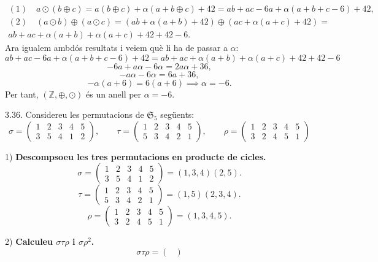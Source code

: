 \documentclass[11pt]{article}
\begin{document}
\begin{legal}
\begin{legal}
		\[
		\begin{array}{lcl}
			(1)\quad a\odot(b\oplus c)=a(b\oplus c)+\alpha(a+b\oplus c)+42=ab+ac-6a+\alpha(a+b+c-6)+42,\\
			(2)\quad (a\odot b)\oplus(a\odot c)=(ab+\alpha(a+b)+42)\oplus(ac+\alpha(a+c)+42)=\\
			ab+ac+\alpha(a+b)+\alpha(a+c)+42+42-6.
		\end{array}
		\]
		Ara igualem ambdós resultats i veiem què li ha de passar a $\alpha$:
		$$
		ab+ac-6a+\alpha(a+b+c-6)+42=ab+ac+\alpha(a+b)+\alpha(a+c)+42+42-6
		$$
		$$
		-6a+a\alpha-6\alpha=2a\alpha+36,
		$$
		$$
		-a\alpha-6\alpha=6a+36,
		$$
		$$
		-\alpha(a+6)=6(a+6)\implies \alpha=-6.
		$$
		Per tant, $(\mathbb{Z},\oplus,\odot)$ és un anell per $\alpha=-6$.
	\end{legal}\newpage
\item[3.36.] Considereu les permutacions de $\mathfrak{S}_5$ següents:
	$$
	\sigma=
	\begin{pmatrix}
		1 & 2 & 3 & 4 & 5\\
		3 & 5 & 4 & 1 & 2
	\end{pmatrix},
	\qquad
	\tau=
	\begin{pmatrix}
		1 & 2 & 3 & 4 & 5\\
		5 & 3 & 4 & 2 & 1
	\end{pmatrix},
	\qquad
	\rho=
	\begin{pmatrix}
		1 & 2 & 3 & 4 & 5\\
		3 & 2 & 4 & 5 & 1
	\end{pmatrix}
	$$
	\begin{legal}
		\item[1) ]\textbf{Descompsoeu les tres permutacions en producte de cicles.}
		$$\sigma=
		\begin{pmatrix}
			1 & 2 & 3 & 4 & 5\\
			3 & 5 & 4 & 1 & 2
		\end{pmatrix}
		=(1,3,4)(2,5).
		$$
		$$\tau=
		\begin{pmatrix}
			1 & 2 & 3 & 4 & 5\\
			5 & 3 & 4 & 2 & 1
		\end{pmatrix}
		=(1,5)(2,3,4).
		$$
		$$\rho=
		\begin{pmatrix}
			1 & 2 & 3 & 4 & 5\\
			3 & 2 & 4 & 5 & 1
		\end{pmatrix}
		=(1,3,4,5).
		$$
		\item[2) ]\textbf{Calculeu $\sigma\tau\rho$ i $\sigma\rho^2$.}
		$$
		\sigma\tau\rho=\begin{pmatrix}

\end{pmatrix}$$
\end{legal}
\end{legal}
\end{document}
